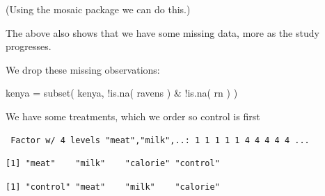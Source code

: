 \documentclass[
  letterpaper,
  DIV=11,
  numbers=noendperiod]{scrreprt}
\newenvironment{Shaded}{\begin{snugshade}}{\end{snugshade}}
\newcommand{\AttributeTok}[1]{\textcolor[rgb]{0.49,0.56,0.16}{#1}}
\newcommand{\FunctionTok}[1]{\textcolor[rgb]{0.02,0.16,0.49}{#1}}
\newcommand{\NormalTok}[1]{\textcolor[rgb]{0.00,0.44,0.13}{#1}}
\newcommand{\OtherTok}[1]{\textcolor[rgb]{0.00,0.44,0.13}{#1}}
\newcommand{\SpecialCharTok}[1]{\textcolor[rgb]{0.25,0.44,0.63}{#1}}
\newcommand{\StringTok}[1]{\textcolor[rgb]{0.25,0.44,0.63}{#1}}
\begin{document}
(Using the mosaic package we can do this.)

The above also shows that we have some missing data, more as the study
progresses.

We drop these missing observations:

\begin{Shaded}
\begin{Highlighting}[]
\NormalTok{kenya }\OtherTok{=} \FunctionTok{subset}\NormalTok{( kenya, }\SpecialCharTok{!}\FunctionTok{is.na}\NormalTok{( ravens ) }\SpecialCharTok{\&} \SpecialCharTok{!}\FunctionTok{is.na}\NormalTok{( rn ) )}
\end{Highlighting}
\end{Shaded}

We have some treatments, which we order so control is first

\begin{Shaded}
\end{Shaded}

\begin{verbatim}
 Factor w/ 4 levels "meat","milk",..: 1 1 1 1 1 4 4 4 4 4 ...
\end{verbatim}

\begin{Shaded}
\end{Shaded}

\begin{verbatim}
[1] "meat"    "milk"    "calorie" "control"
\end{verbatim}

\begin{Shaded}
\end{Shaded}

\begin{verbatim}
[1] "control" "meat"    "milk"    "calorie"
\end{verbatim}
\end{document}
